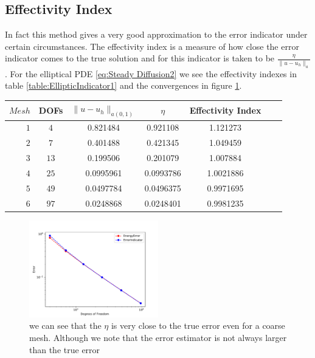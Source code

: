 \documentclass{uonmathreport}
\theoremstyle{definition}
\theoremstyle{problem}
\theoremstyle{theorem}
\begin{document}
\subsection{Effectivity Index} \label{subsec:results3}

In fact this method gives a very good approximation to the error indicator under certain circumstances. The effectivity index is a measure of how close the error indicator comes to the true solution and for this indicator is taken to be $ \frac{\eta}{\|u-u_h\|_a} $. For the elliptical PDE \ref{eq:Steady Diffusion2} we see the effectivity indexes in table \ref{table:EllipticIndicator1} and the convergences in figure \ref{fig:IndicatorEllipticalCAM}.


\begin{center}
  \begin{tabular}{r|cccccc}  \label{table:EllipticIndicator1}
    $Mesh$   & DOFs & $\|u-u_h\|_{a(0,1)}$ & $\eta$ & Effectivity Index \\ \hline
    $1$ & $4$ & 0.821484 &  0.921108    &  1.121273  \\
    $2$ & $7$ & 0.401488 &  0.421345     &  1.049459 \\
    $3$ & $13$ & 0.199506 & 0.201079     &   1.007884 \\
	$4$ & $25$ & 0.0995961 &  0.0993786     & 1.0021886    \\
    $5$ & $49$ & 0.0497784 &  0.0496375     &   0.9971695 \\
    $6$ & $97$ & 0.0248868 &  0.0248401      &  0.9981235  \\
  \end{tabular}
\end{center}

\begin{figure}
\caption{we can see that the $\eta$ is very close to the true error even for a coarse mesh. Although we note that the error estimator is not always larger than the true error}
   \includegraphics[width=0.5\textwidth]{IndicatorElipticPDE_CAM.pdf}
   
 \label{fig:IndicatorEllipticalCAM}
\end{figure}
\end{document}
